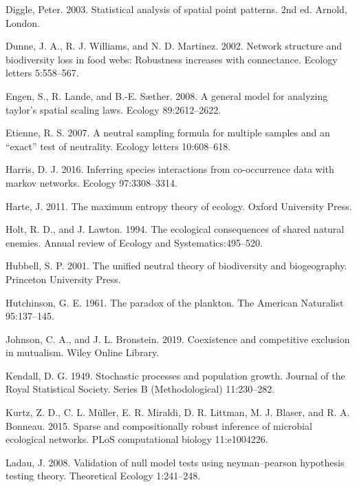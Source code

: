 \documentclass[
  letterpaper,
  DIV=11,
  numbers=noendperiod]{scrartcl}
\newlength{\cslhangindent}
\newenvironment{CSLReferences}[2] %
 {\begin{list}{}{%
  \setlength{\itemindent}{0pt}
  \setlength{\leftmargin}{0pt}
  \setlength{\parsep}{0pt}
  \ifodd #1
   \setlength{\leftmargin}{\cslhangindent}
   \setlength{\itemindent}{-1\cslhangindent}
  \fi
  \setlength{\itemsep}{#2\baselineskip}}}
 {\end{list}}
\begin{document}
\begin{CSLReferences}{1}{0}
Diggle, Peter. 2003. Statistical analysis of spatial point patterns. 2nd
ed. Arnold, London.

Dunne, J. A., R. J. Williams, and N. D. Martinez. 2002. Network
structure and biodiversity loss in food webs: Robustness increases with
connectance. Ecology letters 5:558--567.

Engen, S., R. Lande, and B.-E. Sæther. 2008. A general model for
analyzing taylor's spatial scaling laws. Ecology 89:2612--2622.

Etienne, R. S. 2007. A neutral sampling formula for multiple samples and
an {``exact''} test of neutrality. Ecology letters 10:608--618.

Harris, D. J. 2016. Inferring species interactions from co-occurrence
data with markov networks. Ecology 97:3308--3314.

Harte, J. 2011. The maximum entropy theory of ecology. Oxford University
Press.

Holt, R. D., and J. Lawton. 1994. The ecological consequences of shared
natural enemies. Annual review of Ecology and Systematics:495--520.

Hubbell, S. P. 2001. The unified neutral theory of biodiversity and
biogeography. Princeton University Press.

Hutchinson, G. E. 1961. The paradox of the plankton. The American
Naturalist 95:137--145.

Johnson, C. A., and J. L. Bronstein. 2019. Coexistence and competitive
exclusion in mutualism. Wiley Online Library.

Kendall, D. G. 1949. Stochastic processes and population growth. Journal
of the Royal Statistical Society. Series B (Methodological) 11:230--282.

Kurtz, Z. D., C. L. Müller, E. R. Miraldi, D. R. Littman, M. J. Blaser,
and R. A. Bonneau. 2015. Sparse and compositionally robust inference of
microbial ecological networks. PLoS computational biology 11:e1004226.

Ladau, J. 2008. Validation of null model tests using neyman--pearson
hypothesis testing theory. Theoretical Ecology 1:241--248.


\end{CSLReferences}
\end{document}
